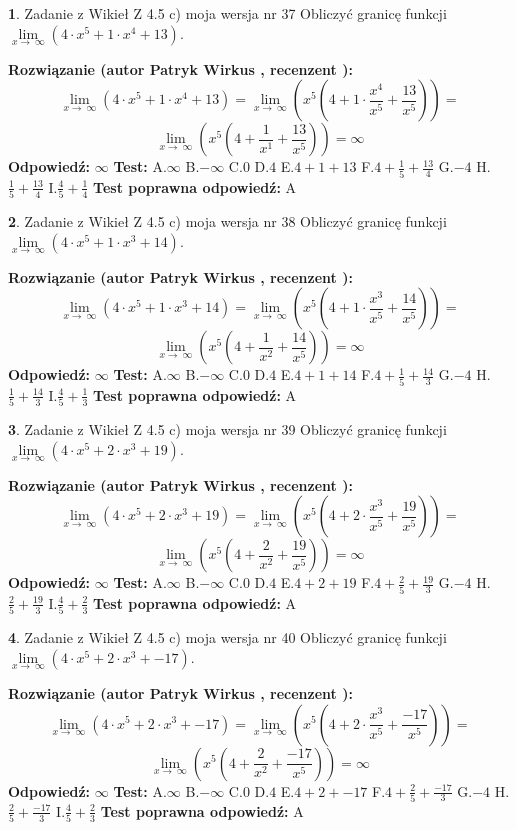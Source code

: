 \documentclass[12pt, a4paper]{article}
\theoremstyle{definition} %
\newtheorem{zad}{}
\newcommand{\zadStart}[1]{\begin{zad}#1\newline}
\newcommand{\zadStop}{\end{zad}}
\newcommand{\rozwStart}[2]{\noindent \textbf{Rozwiązanie (autor #1 , recenzent #2): }\newline}
\newcommand{\rozwStop}{\newline}
\newcommand{\odpStart}{\noindent \textbf{Odpowiedź:}\newline}
\newcommand{\odpStop}{\newline}
\newcommand{\testStart}{\noindent \textbf{Test:}\newline}
\newcommand{\testStop}{\newline}
\newcommand{\kluczStart}{\noindent \textbf{Test poprawna odpowiedź:}\newline}
\newcommand{\kluczStop}{\newline}
\begin{document}
\zadStart{Zadanie z Wikieł Z 4.5 c) moja wersja nr 37}
Obliczyć granicę funkcji  $\lim\limits_{x\to\ \infty}(4 \cdot x^{5}+1 \cdot x^{4}+13)$.
\zadStop
\rozwStart{Patryk Wirkus}{}
$$\lim\limits_{x\to\ \infty}(4 \cdot x^{5}+1 \cdot x^{4}+13) = \lim\limits_{x\to\ \infty}(x^{5}(4 +1 \cdot \frac{x^{4}}{x^{5}}+\frac{13}{x^{5}})) =$$ $$\lim\limits_{x\to\ \infty}(x^{5}(4 +\frac{1}{x^{1}}+\frac{13}{x^{5}})) =\infty$$
\rozwStop
\odpStart
$\infty$
\odpStop
\testStart
A.$\infty$ B.$-\infty$ C.$0$ D.$4$ E.$4 + 1 + 13$
F.$4+\frac{1}{5}+\frac{13}{4}$ G.$-4$
H.$\frac{1}{5}+\frac{13}{4}$
I.$\frac{4}{5}+\frac{1}{4}$
\testStop
\kluczStart
A
\kluczStop



\zadStart{Zadanie z Wikieł Z 4.5 c) moja wersja nr 38}
Obliczyć granicę funkcji  $\lim\limits_{x\to\ \infty}(4 \cdot x^{5}+1 \cdot x^{3}+14)$.
\zadStop
\rozwStart{Patryk Wirkus}{}
$$\lim\limits_{x\to\ \infty}(4 \cdot x^{5}+1 \cdot x^{3}+14) = \lim\limits_{x\to\ \infty}(x^{5}(4 +1 \cdot \frac{x^{3}}{x^{5}}+\frac{14}{x^{5}})) =$$ $$\lim\limits_{x\to\ \infty}(x^{5}(4 +\frac{1}{x^{2}}+\frac{14}{x^{5}})) =\infty$$
\rozwStop
\odpStart
$\infty$
\odpStop
\testStart
A.$\infty$ B.$-\infty$ C.$0$ D.$4$ E.$4 + 1 + 14$
F.$4+\frac{1}{5}+\frac{14}{3}$ G.$-4$
H.$\frac{1}{5}+\frac{14}{3}$
I.$\frac{4}{5}+\frac{1}{3}$
\testStop
\kluczStart
A
\kluczStop



\zadStart{Zadanie z Wikieł Z 4.5 c) moja wersja nr 39}
Obliczyć granicę funkcji  $\lim\limits_{x\to\ \infty}(4 \cdot x^{5}+2 \cdot x^{3}+19)$.
\zadStop
\rozwStart{Patryk Wirkus}{}
$$\lim\limits_{x\to\ \infty}(4 \cdot x^{5}+2 \cdot x^{3}+19) = \lim\limits_{x\to\ \infty}(x^{5}(4 +2 \cdot \frac{x^{3}}{x^{5}}+\frac{19}{x^{5}})) =$$ $$\lim\limits_{x\to\ \infty}(x^{5}(4 +\frac{2}{x^{2}}+\frac{19}{x^{5}})) =\infty$$
\rozwStop
\odpStart
$\infty$
\odpStop
\testStart
A.$\infty$ B.$-\infty$ C.$0$ D.$4$ E.$4 + 2 + 19$
F.$4+\frac{2}{5}+\frac{19}{3}$ G.$-4$
H.$\frac{2}{5}+\frac{19}{3}$
I.$\frac{4}{5}+\frac{2}{3}$
\testStop
\kluczStart
A
\kluczStop



\zadStart{Zadanie z Wikieł Z 4.5 c) moja wersja nr 40}
Obliczyć granicę funkcji  $\lim\limits_{x\to\ \infty}(4 \cdot x^{5}+2 \cdot x^{3}+-17)$.
\zadStop
\rozwStart{Patryk Wirkus}{}
$$\lim\limits_{x\to\ \infty}(4 \cdot x^{5}+2 \cdot x^{3}+-17) = \lim\limits_{x\to\ \infty}(x^{5}(4 +2 \cdot \frac{x^{3}}{x^{5}}+\frac{-17}{x^{5}})) =$$ $$\lim\limits_{x\to\ \infty}(x^{5}(4 +\frac{2}{x^{2}}+\frac{-17}{x^{5}})) =\infty$$
\rozwStop
\odpStart
$\infty$
\odpStop
\testStart
A.$\infty$ B.$-\infty$ C.$0$ D.$4$ E.$4 + 2 + -17$
F.$4+\frac{2}{5}+\frac{-17}{3}$ G.$-4$
H.$\frac{2}{5}+\frac{-17}{3}$
I.$\frac{4}{5}+\frac{2}{3}$
\testStop
\kluczStart
A
\kluczStop
\end{document}
